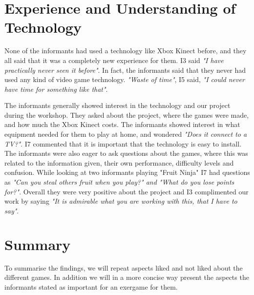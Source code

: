 \section{Experience and Understanding of Technology}
None of the informants had used a technology like Xbox Kinect before, and they all said that it was a completely new experience for them. I3 said \emph{"I have practically never seen it before"}. In fact, the informants said that they never had used any kind of video game technology. \emph{"Waste of time"}, I5 said, \emph{"I could never have time for something like that"}.  

The informants generally showed interest in the technology and our project during the workshop. They asked about the project, where the games were made, and how much the Xbox Kinect costs. The informants showed interest in what equipment needed for them to play at home, and wondered  \emph{"Does it connect to a TV?"}. I7 commented that it is important that the technology is easy to install. The informants were also eager to ask questions about the games, where this was related to the information given, their own performance, difficulty levels and confusion. While looking at two informants playing "Fruit Ninja" I7 had questions as \emph{"Can you steal others fruit when you play?" and "What do you lose points for?"}. Overall they were very positive about the project and I3 complimented our work by saying \emph{"It is admirable what you are working with this, that I have to say"}. 


\section{Summary}
To summarise the findings, we will repeat aspects liked and not liked about the different games. In addition we will in a more concise way present the aspects the informants stated as important for an exergame for them. 

